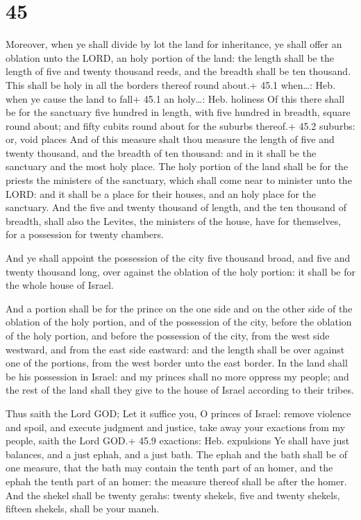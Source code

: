 \hypertarget{section-44}{%
\section{45}\label{section-44}}

 Moreover, when ye shall divide by lot the land for
inheritance, ye shall offer an oblation unto the LORD, an holy portion
of the land: the length shall be the length of five and twenty thousand
reeds, and the breadth shall be ten thousand. This shall be holy in all
the borders thereof round about.+ 45.1 when\ldots: Heb. when ye cause
the land to fall+ 45.1 an holy\ldots: Heb. holiness  Of this
there shall be for the sanctuary five hundred in length, with five
hundred in breadth, square round about; and fifty cubits round about for
the suburbs thereof.+ 45.2 suburbs: or, void places  And of
this measure shalt thou measure the length of five and twenty thousand,
and the breadth of ten thousand: and in it shall be the sanctuary and
the most holy place.  The holy portion of the land shall be
for the priests the ministers of the sanctuary, which shall come near to
minister unto the LORD: and it shall be a place for their houses, and an
holy place for the sanctuary.  And the five and twenty
thousand of length, and the ten thousand of breadth, shall also the
Levites, the ministers of the house, have for themselves, for a
possession for twenty chambers.

 And ye shall appoint the possession of the city five
thousand broad, and five and twenty thousand long, over against the
oblation of the holy portion: it shall be for the whole house of Israel.

 And a portion shall be for the prince on the one side and
on the other side of the oblation of the holy portion, and of the
possession of the city, before the oblation of the holy portion, and
before the possession of the city, from the west side westward, and from
the east side eastward: and the length shall be over against one of the
portions, from the west border unto the east border.  In the
land shall be his possession in Israel: and my princes shall no more
oppress my people; and the rest of the land shall they give to the house
of Israel according to their tribes.

 Thus saith the Lord GOD; Let it suffice you, O princes of
Israel: remove violence and spoil, and execute judgment and justice,
take away your exactions from my people, saith the Lord GOD.+ 45.9
exactions: Heb. expulsions  Ye shall have just balances,
and a just ephah, and a just bath.  The ephah and the bath
shall be of one measure, that the bath may contain the tenth part of an
homer, and the ephah the tenth part of an homer: the measure thereof
shall be after the homer.  And the shekel shall be twenty
gerahs: twenty shekels, five and twenty shekels, fifteen shekels, shall
be your maneh.

